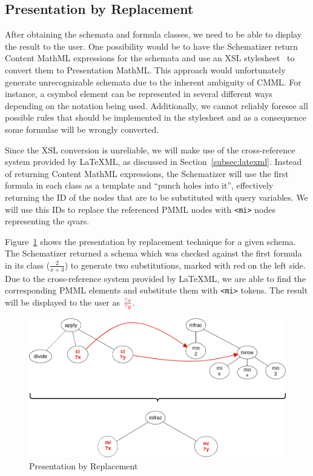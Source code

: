 \documentclass[a4paper,oneside]{article}
\def\red#1{\textcolor{red}{#1}}
\def\cmml{\textsf{Content MathML}\xspace}
\def\pmml{\textsf{Presentation MathML}\xspace}
\def\latexml{\LaTeX{ML}\xspace}
\begin{document}
\subsection{Presentation by Replacement}\label{subsec:make_sch_recog}
After obtaining the schemata and formula classes, we need to be able to display
the result to the user. One possibility would be to have the Schematizer return
\cmml expressions for the schemata and use an XSL
stylesheet~\cite{carlisle:online} to convert them to \pmml. This approach
would unfortunately generate unrecognizable schemata due to the inherent
ambiguity of CMML. For instance, a \textsf{csymbol} element can be
represented in several different ways depending on the notation being used.
Additionally, we cannot reliably foresee all possible rules that should be
implemented in the stylesheet and as a consequence some formulae will be
wrongly converted.

Since the XSL conversion is unreliable, we will make use of the cross-reference
system provided by \latexml, as discussed in Section~\ref{subsec:latexml}.
Instead of returning \cmml expressions, the Schematizer will use the first
formula in each class as a template and ``punch holes into it'', effectively
returning the ID of the nodes that are to be substituted with query variables.
We will use this IDs to replace the referenced PMML nodes with \verb|<mi>|
nodes representing the qvars.

Figure~\ref{fig:replacement_pres} shows the presentation by replacement
technique for a given schema. The Schematizer returned a schema which was
checked against the first formula in its class ($\frac{2}{x+3}$) to generate
two substitutions, marked with red on the left side. Due to the cross-reference
system provided by \latexml, we are able to find the corresponding PMML
elements and substitute them with \verb|<mi>| tokens. The result will be
displayed to the user as $\frac{\red{?x}}{\red{?y}}$.

\begin{figure}[ht]\centering
    \includegraphics[scale=0.3]{img/replacement_pres.png}
    \caption{Presentation by Replacement}\label{fig:replacement_pres}
\end{figure}
\FloatBarrier
\end{document}
